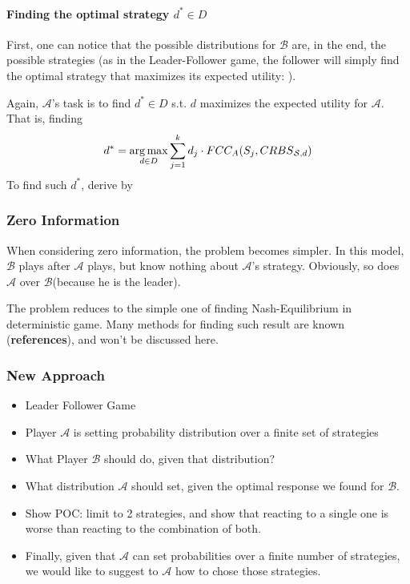 \documentclass[a4paper,10pt]{article}
\newcommand{\fcc}{\ensuremath{FCC}\xspace}
\newcommand{\A}{\ensuremath{\mathcal{A}}\xspace}
\newcommand{\B}{\ensuremath{\mathcal{B}}\xspace}
\DeclareMathOperator*{\argmax}{arg\,max} %
\begin{document}
\paragraph{Finding the optimal strategy $d^*\in D$}
First, one can notice that the possible distributions for \B are, in the end, the possible strategies (as in the Leader-Follower game, the follower will simply find the optimal strategy that maximizes its expected utility: \crbs).


Again, \A's task is to find $d^*\in D$ s.t. $d$ maximizes the expected utility for \A. That is, finding \[d^*=\argmax_{d\in D}{\sum_{j=1}^{k}{d_j\cdot \fcc_A(S_j,\crbs[\mathcal{S}][d])}}\]
To find such $d^*$, derive by 



\subsubsection{Zero Information}
When considering zero information, the problem becomes simpler. In this model, \B plays after \A plays, but know nothing about \A's strategy. Obviously, so does \A over \B (because he is the leader). 

The problem reduces to the simple one of finding Nash-Equilibrium in deterministic game. Many methods for finding such result are known (\textbf{references}), and won't be discussed here.


\subsubsection{New Approach}
\begin{itemize}
    \item Leader Follower Game
    \item Player \A is setting probability distribution over a finite set of strategies
    \item What Player \B should do, given that distribution?
    \item What distribution \A should set, given the optimal response we found for \B.
    \item Show POC: limit to 2 strategies, and show that reacting to a single one is worse than reacting to the combination of both.
    \item Finally, given that \A can set probabilities over a finite number of strategies, we would like to suggest to \A how to chose those strategies.
\end{itemize}
\end{document}
